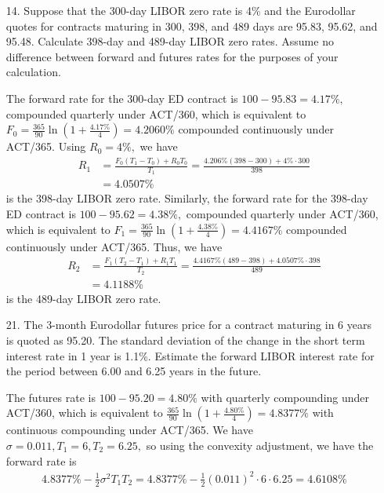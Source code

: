 \documentclass{article}
\begin{document}
\begin{itemize}
	\item[14.] Suppose that the 300-day LIBOR zero rate is 4\% and the Eurodollar quotes for contracts maturing in 300, 398, and 489 days are 95.83, 95.62, and 95.48. Calculate 398-day and 489-day LIBOR zero rates. Assume no difference between forward and futures rates for the purposes of your calculation.
		\begin{soln}
			The forward rate for the 300-day ED contract is $100-95.83=4.17\%,$ compounded quarterly under ACT/360, which is equivalent to $F_0=\frac{365}{90}\ln\left( 1+\frac{4.17\%}{4} \right) = 4.2060\%$ compounded continuously under ACT/365. Using $R_0=4\%,$ we have
			\begin{align*}
				R_1 &= \frac{F_0(T_1-T_0)+R_0T_0}{T_1} = \frac{4.206\%(398-300) + 4\%\cdot 300}{398} \\
				&= 4.0507\%
			\end{align*}
			is the 398-day LIBOR zero rate. Similarly, the forward rate for the 398-day ED contract is $100-95.62=4.38\%,$ compounded quarterly under ACT/360, which is equivalent to $F_1=\frac{365}{90}\ln\left( 1+\frac{4.38\%}{4} \right) = 4.4167\%$ compounded continuously under ACT/365. Thus, we have
			\begin{align*}
				R_2 &= \frac{F_1(T_2-T_1)+R_1T_1}{T_2} = \frac{4.4167\%(489-398) + 4.0507\%\cdot 398}{489} \\
				&= 4.1188\%
			\end{align*}
			is the 489-day LIBOR zero rate.
		\end{soln}

	\item[21.] The 3-month Eurodollar futures price for a contract maturing in 6 years is quoted as 95.20. The standard deviation of the change in the short term interest rate in 1 year is 1.1\%. Estimate the forward LIBOR interest rate for the period between 6.00 and 6.25 years in the future.
		\begin{soln}
			The futures rate is $100-95.20=4.80\%$ with quarterly compounding under ACT/360, which is equivalent to $\frac{365}{90}\ln\left( 1+\frac{4.80\%}{4} \right) = 4.8377\%$ with continuous compounding under ACT/365. We have $\sigma=0.011, T_1=6, T_2=6.25,$ so using the convexity adjustment, we have the forward rate is
			\begin{align*}
				4.8377\%-\frac{1}{2}\sigma^2T_1T_2 = 4.8377\%-\frac{1}{2}(0.011)^2\cdot 6\cdot 6.25 = 4.6108\%
			\end{align*}
		\end{soln}


\end{itemize}
\end{document}
